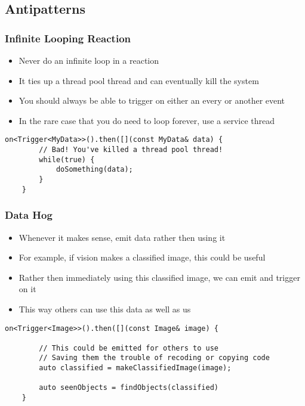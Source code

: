 \documentclass{beamer}
\begin{document}
\subsection{Antipatterns}
\begin{frame}[fragile]
	\frametitle{Infinite Looping Reaction}

	\begin{itemize}
		\item Never do an infinite loop in a reaction
		\item It ties up a thread pool thread and can eventually kill the system
		\item You should always be able to trigger on either an every or another event
		\item In the rare case that you do need to loop forever, use a service thread
	\end{itemize}

	\begin{lstlisting}[language=nuclear]
	on<Trigger<MyData>>().then([](const MyData& data) {
	    // Bad! You've killed a thread pool thread!
	    while(true) {
	        doSomething(data);
	    }
	}
	\end{lstlisting}
\end{frame}

\begin{frame}[fragile]
	\frametitle{Data Hog}

	\begin{itemize}
		\item Whenever it makes sense, emit data rather then using it
		\item For example, if vision makes a classified image, this could be useful
		\item Rather then immediately using this classified image, we can emit and trigger on it
		\item This way others can use this data as well as us
	\end{itemize}

	\begin{lstlisting}[language=nuclear]
	on<Trigger<Image>>().then([](const Image& image) {

	    // This could be emitted for others to use
	    // Saving them the trouble of recoding or copying code
	    auto classified = makeClassifiedImage(image);

	    auto seenObjects = findObjects(classified)
	}
	\end{lstlisting}
\end{frame}
\end{document}
